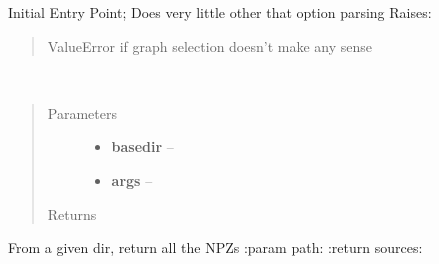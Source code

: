 \documentclass[letterpaper,10pt,english]{sphinxmanual}
\begin{document}

\begin{fulllineitems}
\label{index:bounos.main}
Initial Entry Point; Does very little other that option parsing
Raises:
\begin{quote}

ValueError if graph selection doesn't make any sense
\end{quote}

\end{fulllineitems}


\begin{fulllineitems}
\label{index:bounos.multirun}~\begin{quote}\begin{description}
\item[{Parameters}] \leavevmode\begin{itemize}
\item {} 
\textbf{basedir} -- 

\item {} 
\textbf{args} -- 

\end{itemize}

\item[{Returns}] \leavevmode


\end{description}\end{quote}

\end{fulllineitems}


\begin{fulllineitems}
\label{index:bounos.npz_in_dir}
From a given dir, return all the NPZs
:param path:
:return sources:

\end{fulllineitems}

\end{document}
